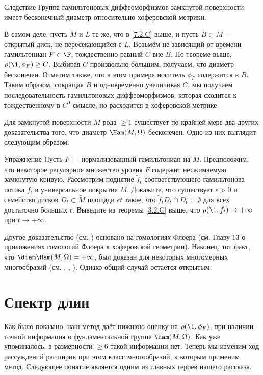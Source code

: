\begin{thm}{Следствие}\label{7.2.D} Группа гамильтоновых диффеоморфизмов замкнутой поверхности имеет бесконечный диаметр относительно хоферовской метрики.
\end{thm}

В самом деле, пусть $M$ и $L$ те же, что в \ref{7.2.C} выше, и пусть $B \subset M$ --- открытый диск, не пересекающийся с $L$.
Возьмём не зависящий от времени гамильтониан $F \in \F$, тождественно равный $C$ вне $B$.
По теореме выше, $\rho (\1, \phi_F) \ge C$.
Выбирая $C$ произвольно большим, получаем, что диаметр бесконечен.
Отметим также, что в этом примере носитель $\phi_F$ содержится в $B$.
Таким образом, сокращая $B$ и одновременно увеличивая $C$, мы получаем последовательность гамильтоновых диффеоморфизмов, которая сходится к тождественному в $C^0$-смысле, но расходится в хоферовской метрике.

Для замкнутой поверхности $M$ рода $\ge 1$ существует по крайней мере два других доказательства того, что диаметр $\Ham (M, \Omega)$ бесконечен.
Одно из них выглядит следующим образом.

\begin{thm}[см. \cite{LM2}.]{Упражнение} \label{7.2.E}
Пусть $F$ --- нормализованный гамильтониан на $M$.
Предположим, что некоторое регулярное множество уровня $F$ содержит несжимаемую замкнутую кривую.
Рассмотрим поднятие $\tilde f_t$ соответствующего гамильтонова потока $f_t$ в универсальное покрытие $\tilde M$.
Докажите, что существует $\epsilon> 0$ и семейство дисков $D_t \subset \tilde M$ площади $\epsilon t$ такое, что $\tilde f_t D_t \cap D_t = \emptyset$ для всех достаточно больших $t$.
Выведите из теоремы \ref{3.2.C} выше, что $\rho (\1, f_t) \to + \infty$ при $t \to + \infty$.
\end{thm}

Другое доказательство (см. \cite{Sch3}) основано на гомологиях Флоера (см. Главу 13 о приложениях гомологий Флоера к хоферовской геометрии).
Наконец, тот факт, что $\diam \Ham (M, \Omega) = + \infty$, был доказан для некоторых многомерных многообразий (см. \cite{LM2}, \cite{Sch3}, \cite{P5}).
Однако общий случай остаётся открытым.

\section{Спектр длин} 

Как было показано, наш метод даёт нижнюю оценку на $\rho (\1, \phi_F)$, при наличии точной информация о фундаментальной группе $\Ham (M, \Omega)$.
Как уже упоминалось, в размерности $\ge 6$ такой информации нет.
Теперь мы изменим ход рассуждений расширив при этом класс многообразий, к которым применим метод.
Следующее понятие является одним из главных героев нашего рассказа.

